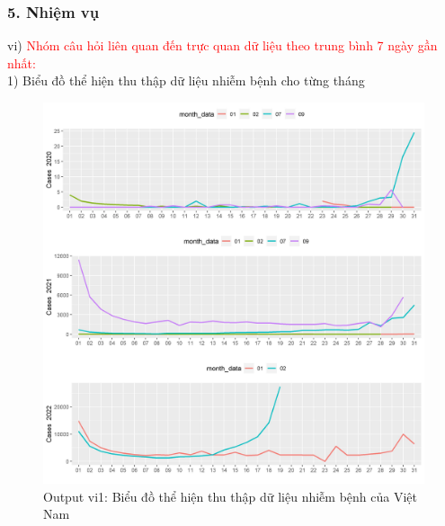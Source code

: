 \documentclass[english,10pt,table]{beamer}
\begin{document}
\begin{frame}[fragile]
\frametitle{5.  Nhiệm vụ}
vi) \textcolor{red}{Nhóm câu hỏi liên quan đến trực quan dữ liệu theo trung bình 7 ngày gần nhất:}\\
    1) Biểu đồ thể hiện thu thập dữ liệu nhiễm bệnh cho từng tháng
	\begin{figure}[h!]
	\begin{center}
		    \includegraphics[scale = 0.26]{Images/VI/vi1 Vietnam .jpeg}
		     \caption{Output vi1: Biểu đồ thể hiện thu thập dữ liệu nhiễm bệnh của Việt Nam}
		\end{center}
		\end{figure}
\end{frame}
\end{document}

